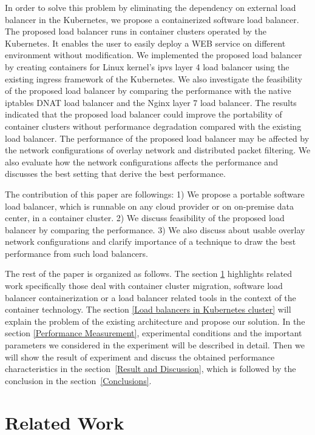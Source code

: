 In order to solve this problem by eliminating the dependency on external load balancer in the Kubernetes, 
we propose a containerized software load balancer. 
The proposed load balancer runs in container clusters operated by the Kubernetes. 
It enables the user to easily deploy a WEB service on different environment without modification. 
We implemented the proposed load balancer by creating containers for Linux kernel's ipvs\cite{Zhang2000} 
layer 4 load balancer using the existing ingress\cite{K8sIngress2017} framework of the Kubernetes. 
We also investigate the feasibility of the proposed load balancer by comparing the performance 
with the native iptables DNAT load balancer and the Nginx layer 7 load balancer. 
The results indicated that the proposed load balancer could improve the portability of container clusters 
without performance degradation compared with the existing load balancer. 
The performance of the proposed load balancer may be affected by the network configurations of overlay network 
and distributed packet filtering. 
We also evaluate how the network configurations affects the performance and discusses 
the best setting that derive the best performance.

The contribution of this paper are followings: 
1) We propose a portable software load balancer, 
which is runnable on any cloud provider or on on-premise data center, 
in a container cluster.
2) We discuss feasibility of the proposed load balancer by comparing the performance.
3) We also discuss about usable overlay network configurations and clarify importance of a technique 
to draw the best performance from such load balancers.  

The rest of the paper is organized as follows.
The section \ref{Related Work} highlights related work specifically those deal with container cluster migration, 
software load balancer containerization or a load balancer related tools in the context of the container technology. 
The section \ref{Load balancers in Kubernetes cluster} will explain the problem of the existing architecture and propose our solution.
In the section \ref{Performance Measurement}, experimental conditions and the important parameters 
we considered in the experiment will be described in detail.
Then we will show the result of experiment and discuss the obtained performance characteristics in the section~\ref{Result and Discussion},  
which is followed by the conclusion in the section~\ref{Conclusions}.

\section{Related Work}\label{Related Work}


